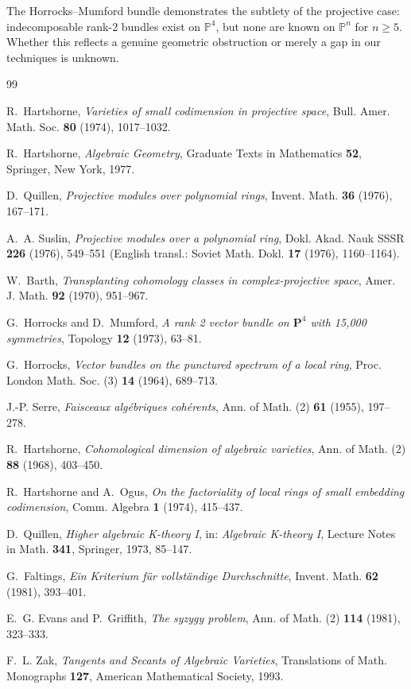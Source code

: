 \documentclass[12pt,a4paper]{amsart}
\theoremstyle{definition}
\theoremstyle{remark}
\newcommand{\PP}{\mathbb{P}}
\begin{document}
The Horrocks--Mumford bundle demonstrates the subtlety of the projective
case: indecomposable rank-2 bundles exist on $\PP^4$, but none are known on
$\PP^n$ for $n \ge 5$.  Whether this reflects a genuine geometric obstruction
or merely a gap in our techniques is unknown.

\begin{thebibliography}{99}

R.~Hartshorne,
\textit{Varieties of small codimension in projective space},
Bull. Amer. Math. Soc. \textbf{80} (1974), 1017--1032.

R.~Hartshorne,
\textit{Algebraic Geometry},
Graduate Texts in Mathematics \textbf{52},
Springer, New York, 1977.

D.~Quillen,
\textit{Projective modules over polynomial rings},
Invent. Math. \textbf{36} (1976), 167--171.

A.~A. Suslin,
\textit{Projective modules over a polynomial ring},
Dokl. Akad. Nauk SSSR \textbf{226} (1976), 549--551
(English transl.: Soviet Math. Dokl. \textbf{17} (1976), 1160--1164).

W.~Barth,
\textit{Transplanting cohomology classes in complex-projective space},
Amer. J. Math. \textbf{92} (1970), 951--967.

G.~Horrocks and D.~Mumford,
\textit{A rank 2 vector bundle on $\mathbf{P}^4$ with 15{,}000 symmetries},
Topology \textbf{12} (1973), 63--81.

G.~Horrocks,
\textit{Vector bundles on the punctured spectrum of a local ring},
Proc. London Math. Soc. (3) \textbf{14} (1964), 689--713.

J.-P. Serre,
\textit{Faisceaux algébriques cohérents},
Ann. of Math. (2) \textbf{61} (1955), 197--278.

R.~Hartshorne,
\textit{Cohomological dimension of algebraic varieties},
Ann. of Math. (2) \textbf{88} (1968), 403--450.

R.~Hartshorne and A.~Ogus,
\textit{On the factoriality of local rings of small embedding codimension},
Comm. Algebra \textbf{1} (1974), 415--437.

D.~Quillen,
\textit{Higher algebraic K-theory I},
in: \textit{Algebraic K-theory I}, Lecture Notes in Math. \textbf{341},
Springer, 1973, 85--147.

G.~Faltings,
\textit{Ein Kriterium für vollständige Durchschnitte},
Invent. Math. \textbf{62} (1981), 393--401.

E.~G. Evans and P.~Griffith,
\textit{The syzygy problem},
Ann. of Math. (2) \textbf{114} (1981), 323--333.

F.~L. Zak,
\textit{Tangents and Secants of Algebraic Varieties},
Translations of Math. Monographs \textbf{127},
American Mathematical Society, 1993.

\end{thebibliography}
\end{document}
